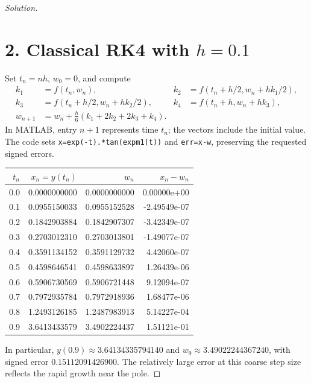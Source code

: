 \documentclass[12pt]{amsart}
\newenvironment{solution}
{\begin{proof}[Solution]}
{\end{proof}}
\begin{document}
\begin{onehalfspace}
\begin{solution}
            \section*{2. Classical RK4 with $h=0.1$}
            Set $t_n=nh$, $w_0=0$, and compute
            \begin{align*}
                k_1&=f(t_n,w_n), & k_2&=f(t_n+h/2,w_n+hk_1/2),\\
                k_3&=f(t_n+h/2,w_n+hk_2/2), & k_4&=f(t_n+h,w_n+hk_3),\\
                w_{n+1}&=w_n+\frac{h}{6}(k_1+2k_2+2k_3+k_4).
            \end{align*}
            In MATLAB, entry $n+1$ represents time $t_n$; the vectors include the
            initial value. The code sets \texttt{x=exp(-t).*tan(expm1(t))} and
            \texttt{err=x-w}, preserving the requested signed errors.
            \begin{center}\small
                \begin{tabular}{rrrr}\toprule
                    $t_n$ & $x_n=y(t_n)$ & $w_n$ & $x_n-w_n$\\\midrule
                    0.0 & 0.0000000000 & 0.0000000000 & 0.00000e+00 \\
                    0.1 & 0.0955150033 & 0.0955152528 & -2.49549e-07 \\
                    0.2 & 0.1842903884 & 0.1842907307 & -3.42349e-07 \\
                    0.3 & 0.2703012310 & 0.2703013801 & -1.49077e-07 \\
                    0.4 & 0.3591134152 & 0.3591129732 & 4.42060e-07 \\
                    0.5 & 0.4598646541 & 0.4598633897 & 1.26439e-06 \\
                    0.6 & 0.5906730569 & 0.5906721448 & 9.12094e-07 \\
                    0.7 & 0.7972935784 & 0.7972918936 & 1.68477e-06 \\
                    0.8 & 1.2493126185 & 1.2487983913 & 5.14227e-04 \\
                    0.9 & 3.6413433579 & 3.4902224437 & 1.51121e-01 \\
                    \bottomrule\end{tabular}
            \end{center}
            In particular, $y(0.9)\approx3.64134335794140$ and
            $w_9\approx3.49022244367240$, with signed error
            $0.15112091426900$. The relatively large error at this coarse step size
            reflects the rapid growth near the pole.


\end{solution}
\end{onehalfspace}
\end{document}
